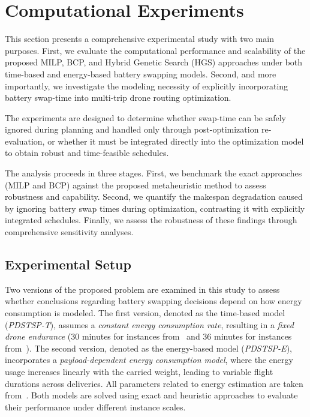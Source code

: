 \documentclass[3p, authoryear, 11pt]{elsarticle}
\begin{document}
\section{Computational Experiments}
\label{sec:computational_experiments}

This section presents a comprehensive experimental study with two main purposes. 
First, we evaluate the computational performance and scalability of the proposed MILP, BCP, and Hybrid Genetic Search (HGS) approaches under both time-based and energy-based battery swapping models. 
Second, and more importantly, we investigate the modeling necessity of explicitly incorporating battery swap-time into multi-trip drone routing optimization.

The experiments are designed to determine whether swap-time can be safely ignored during planning and handled only through post-optimization re-evaluation, or whether it must be integrated directly into the optimization model to obtain robust and time-feasible schedules.

The analysis proceeds in three stages. First, we benchmark the exact approaches (MILP and BCP) against the proposed metaheuristic method to assess robustness and capability. Second, we quantify the makespan degradation caused by ignoring battery swap times during optimization, contrasting it with explicitly integrated schedules. Finally, we assess the robustness of these findings through comprehensive sensitivity analyses.

\subsection{Experimental Setup}

Two versions of the proposed problem are examined in this study to assess whether conclusions regarding battery swapping decisions depend on how energy consumption is modeled.
The first version, denoted as the time-based model (\textit{PDSTSP-T}), assumes a \textit{constant energy consumption rate}, resulting in a \textit{fixed drone endurance} (30 minutes for instances from~\cite{murray_flying_2015} and 36 minutes for instances from~\cite{nguyen_min_cost_2022}).
The second version, denoted as the energy-based model (\textit{PDSTSP-E}), incorporates a \textit{payload-dependent energy consumption model}, where the energy usage increases linearly with the carried weight, leading to variable flight durations across deliveries.
All parameters related to energy estimation are taken from~\cite{dorling_vehicle_2017}.
Both models are solved using exact and heuristic approaches to evaluate their performance under different instance scales.
\end{document}
